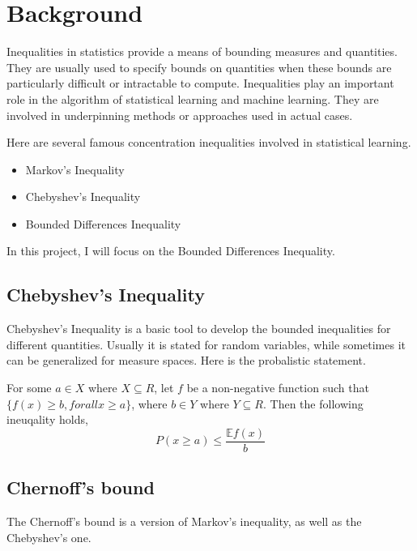 

\section{Background}

Inequalities in statistics provide a means of bounding measures and quantities. 
They are usually used to specify bounds on quantities when these bounds are particularly difficult or intractable to compute.
Inequalities play an important role in the algorithm of statistical learning and machine learning. 
They are involved in underpinning methods or approaches used in actual cases.

Here are several famous concentration inequalities involved in statistical learning. 
\begin{itemize}
  \item Markov's Inequality
  \item Chebyshev's Inequality 
  \item Bounded Differences Inequality 
\end{itemize}

In this project, I will focus on the Bounded Differences Inequality.

\subsection{Chebyshev's Inequality}
Chebyshev's Inequality is a basic tool to develop the bounded inequalities for different quantities. 
Usually it is stated for random variables, while sometimes it can be generalized for measure spaces.
Here is the probalistic statement.
\begin{theorem} 
  For some $a \in X$ where $X \subseteq R$, let $f$ be a non-negative function such that
  $\{ f(x) \geq b, for all x \geq a\}$, where $b \in Y$ where $Y \subseteq R$. Then the following ineuqality holds,
  \begin{equation}
    P(x \geq a) \leq \frac{\mathbb{E}f(x)}{b}
  \end{equation}
\end{theorem}

\subsection{Chernoff's bound}
The Chernoff's bound is a version of Markov's inequality, as well as the Chebyshev's one.

